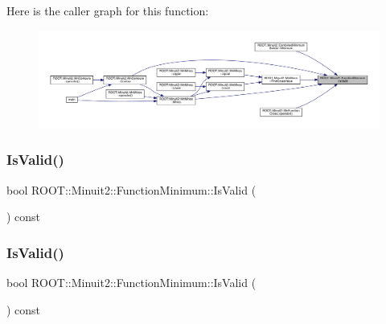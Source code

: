 Here is the caller graph for this function\+:
\nopagebreak
\begin{figure}[H]
\begin{center}
\leavevmode
\includegraphics[width=350pt]{d4/dfb/classROOT_1_1Minuit2_1_1FunctionMinimum_a6525270e63f1cf16206387257b247b69_icgraph}
\end{center}
\end{figure}
\mbox{\label{classROOT_1_1Minuit2_1_1FunctionMinimum_a6525270e63f1cf16206387257b247b69}} 
\subsubsection{\texorpdfstring{IsValid()}{IsValid()}\hspace{0.1cm}{\footnotesize\ttfamily [2/3]}}
{\footnotesize\ttfamily bool R\+O\+O\+T\+::\+Minuit2\+::\+Function\+Minimum\+::\+Is\+Valid (\begin{DoxyParamCaption}{ }\end{DoxyParamCaption}) const\hspace{0.3cm}{\ttfamily [inline]}}

\mbox{\label{classROOT_1_1Minuit2_1_1FunctionMinimum_a6525270e63f1cf16206387257b247b69}} 
\subsubsection{\texorpdfstring{IsValid()}{IsValid()}\hspace{0.1cm}{\footnotesize\ttfamily [3/3]}}
{\footnotesize\ttfamily bool R\+O\+O\+T\+::\+Minuit2\+::\+Function\+Minimum\+::\+Is\+Valid (\begin{DoxyParamCaption}{ }\end{DoxyParamCaption}) const\hspace{0.3cm}{\ttfamily [inline]}}

